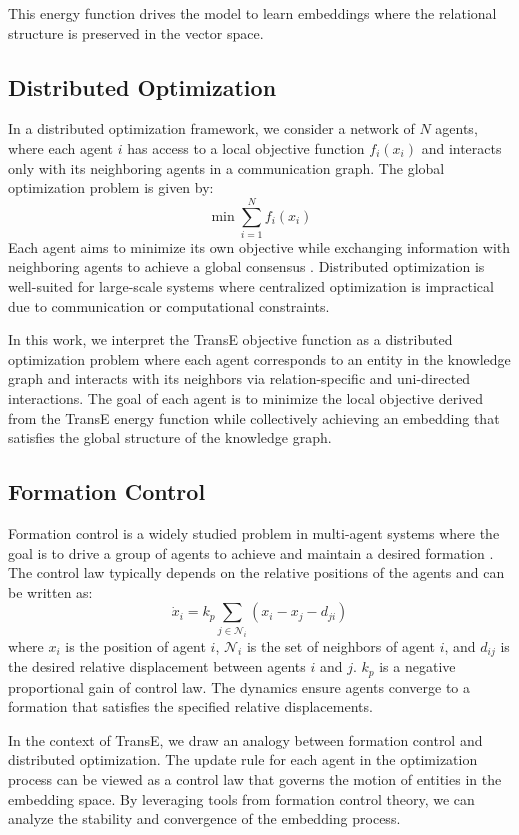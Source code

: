\documentclass[letterpaper, 10 pt, conference]{ieeeconf}  %
\begin{document}
This energy function drives the model to learn embeddings where the relational structure is preserved in the vector space. 

\subsection{Distributed Optimization}
In a distributed optimization framework, we consider a network of $N$ agents, where each agent $i$ has access to a local objective function $f_i(x_i)$ and interacts only with its neighboring agents in a communication graph. The global optimization problem is given by:
\[
\min \sum_{i=1}^{N} f_i(x_i)
\]
Each agent aims to minimize its own objective while exchanging information with neighboring agents to achieve a global consensus \cite{nedic_distributed_2009}. Distributed optimization is well-suited for large-scale systems where centralized optimization is impractical due to communication or computational constraints.

In this work, we interpret the TransE objective function as a distributed optimization problem where each agent corresponds to an entity in the knowledge graph and interacts with its neighbors via relation-specific and uni-directed interactions. The goal of each agent is to minimize the local objective derived from the TransE energy function while collectively achieving an embedding that satisfies the global structure of the knowledge graph.

\subsection{Formation Control}
Formation control is a widely studied problem in multi-agent systems where the goal is to drive a group of agents to achieve and maintain a desired formation \cite{oh_survey_2015}. The control law typically depends on the relative positions of the agents and can be written as:
\[
\dot{x}_i = k_p\sum_{j \in \mathcal{N}_i} (x_i - x_j - d_{ji})
\]
where $x_i$ is the position of agent $i$, $\mathcal{N}_i$ is the set of neighbors of agent $i$, and $d_{ij}$ is the desired relative displacement between agents $i$ and $j$. $k_p$ is a negative proportional gain of control law. The dynamics ensure agents converge to a formation that satisfies the specified relative displacements.

In the context of TransE, we draw an analogy between formation control and distributed optimization. The update rule for each agent in the optimization process can be viewed as a control law that governs the motion of entities in the embedding space. By leveraging tools from formation control theory, we can analyze the stability and convergence of the embedding process.
\end{document}
